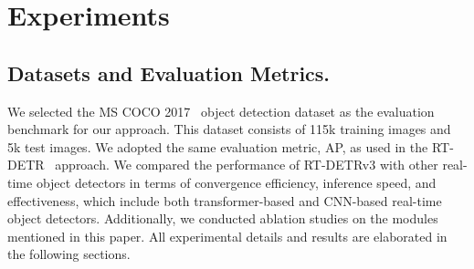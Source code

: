 \documentclass[10pt,twocolumn,letterpaper]{article}
\begin{document}


\section{Experiments}

\subsection{Datasets and Evaluation Metrics.}
We selected the MS COCO 2017~\cite{lin2014coco} object detection dataset as the evaluation benchmark for our approach. This dataset consists of 115k training images and 5k test images. We adopted the same evaluation metric, AP, as used in the RT-DETR~\cite{zhao2024rt-detr} approach. 
We compared the performance of RT-DETRv3 with other real-time object detectors in terms of convergence efficiency, inference speed, and effectiveness, which include both transformer-based and CNN-based real-time object detectors.
Additionally, we conducted ablation studies on the modules mentioned in this paper. All experimental details and results are elaborated in the following sections.
\end{document}
